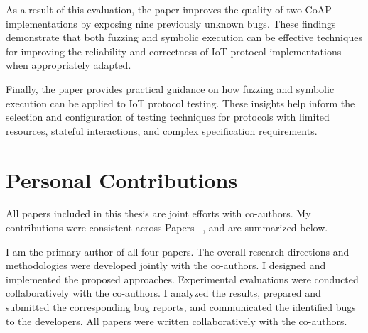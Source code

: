 As a result of this evaluation, the paper improves the quality of two CoAP implementations by exposing nine previously unknown bugs.
These findings demonstrate that both fuzzing and symbolic execution can be effective techniques for improving the reliability and correctness of IoT protocol implementations when appropriately adapted.

Finally, the paper provides practical guidance on how fuzzing and symbolic execution can be applied to IoT protocol testing. 
These insights help inform the selection and configuration of testing techniques for protocols with limited resources, stateful interactions, and complex specification requirements.

\section{Personal Contributions}
All papers included in this thesis are joint efforts with co-authors.
My contributions were consistent across Papers --, and are summarized below.

I am the primary author of all four papers.
The overall research directions and methodologies were developed jointly with the co-authors.
I designed and implemented the proposed approaches. 
Experimental evaluations were conducted collaboratively with the co-authors.
I analyzed the results, prepared and submitted the corresponding bug reports, and communicated the identified bugs to the developers.
All papers were written collaboratively with the co-authors.
